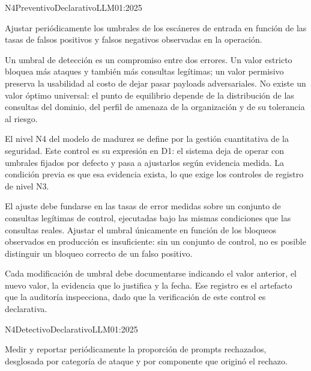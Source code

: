   {N4}{Preventivo}{Declarativo}{LLM01:2025}

Ajustar periódicamente los umbrales de los escáneres de entrada en función de las tasas de falsos positivos y falsos negativos observadas en la operación.

Un umbral de detección es un compromiso entre dos errores. Un valor estricto bloquea más ataques y también más consultas legítimas; un valor permisivo preserva la usabilidad al costo de dejar pasar payloads adversariales. No existe un valor óptimo universal: el punto de equilibrio depende de la distribución de las consultas del dominio, del perfil de amenaza de la organización y de su tolerancia al riesgo.

El nivel N4 del modelo de madurez se define por la gestión cuantitativa de la seguridad. Este control es su expresión en D1: el sistema deja de operar con umbrales fijados por defecto y pasa a ajustarlos según evidencia medida. La condición previa es que esa evidencia exista, lo que exige los controles de registro de nivel N3.

El ajuste debe fundarse en las tasas de error medidas sobre un conjunto de consultas legítimas de control, ejecutadas bajo las mismas condiciones que las consultas reales. Ajustar el umbral únicamente en función de los bloqueos observados en producción es insuficiente: sin un conjunto de control, no es posible distinguir un bloqueo correcto de un falso positivo.

Cada modificación de umbral debe documentarse indicando el valor anterior, el nuevo valor, la evidencia que lo justifica y la fecha. Ese registro es el artefacto que la auditoría inspecciona, dado que la verificación de este control es declarativa.


  {N4}{Detectivo}{Declarativo}{LLM01:2025}

Medir y reportar periódicamente la proporción de prompts rechazados, desglosada por categoría de ataque y por componente que originó el rechazo.

